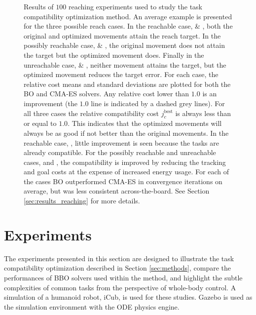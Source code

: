 \documentclass[12pt,a4paper,twoside]{article}
\begin{document}
\begin{figure}[!t]
        \setlength{\belowcaptionskip}{-10pt}
        \caption{Results of $100$ reaching experiments used to study the task compatibility optimization method. An average example is presented for the three possible reach cases.
        In the reachable case, \protect{} \& \protect{}, both the original and optimized movements attain the reach target.
        In the possibly reachable case, \protect{} \& \protect{}, the original movement does not attain the target but the optimized movement does.
        Finally in the unreachable case, \protect{} \& \protect{}, neither movement attains the target, but the optimized movement reduces the target error.
        For each case, the relative cost means and standard deviations are plotted for both the BO and CMA-ES solvers. Any relative cost lower than $1.0$ is an improvement (the $1.0$ line is indicated by a dashed grey lines).
        For all three cases the relative compatibility cost $j_{c}^{\text{best}}$ is always less than or equal to $1.0$. This indicates that the optimized movements will always be as good if not better than the original movements.
        In the reachable case, \protect{}, little improvement is seen because the tasks are already compatible.
        For the possibly reachable and unreachable cases, \protect{} and \protect{}, the compatibility is improved by reducing the tracking and goal costs at the expense of increased energy usage.
        For each of the cases BO outperformed CMA-ES in convergence iterations on average, but was less consistent across-the-board. See Section \ref{sec:results_reaching} for more details.}
        \label{fig:reaching_case_examples}
    \end{figure}


\section{Experiments}
\label{sec:experiments}

The experiments presented in this section are designed to illustrate the task compatibility optimization described in Section \ref{sec:methods}, compare the performances of BBO solvers used within the method, and highlight the subtle complexities of common tasks from the perspective of whole-body control. A simulation of a humanoid robot, iCub, is used for these studies. Gazebo is used as the simulation environment with the ODE physics engine.\\
\end{document}
